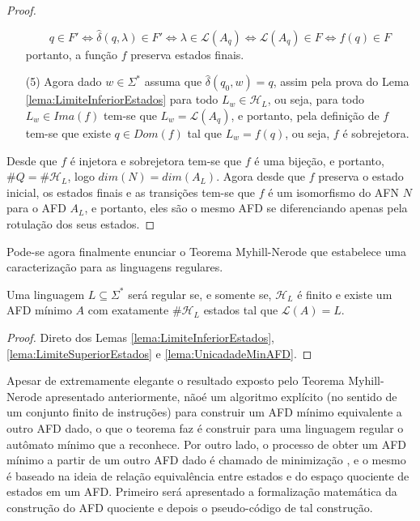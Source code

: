 \begin{proof}
\begin{itemize}
		$$q \in F' \Longleftrightarrow \widehat{\delta}(q, \lambda) \in F' \Longleftrightarrow  \lambda \in \mathcal{L}(A_q) \Longleftrightarrow \mathcal{L}(A_q) \in F \Longleftrightarrow f(q) \in F$$
		portanto, a função $f$ preserva estados finais.
		\item[(5)] Agora dado $w \in \Sigma^*$ assuma que $\widehat{\delta}(q_0, w) = q$, assim pela prova do Lema \ref{lema:LimiteInferiorEstados} para todo $L_w \in \mathcal{H}_L$, ou seja, para todo $L_w \in Ima(f)$ tem-se que $L_w = \mathcal{L}(A_q)$, e portanto, pela definição de $f$ tem-se que existe $q \in D	om(f)$ tal que $L_w = f(q)$, ou seja, $f$ é sobrejetora.
	\end{itemize}
	Desde que $f$ é injetora e sobrejetora tem-se que $f$ é uma bijeção, e portanto, $\#Q = \#\mathcal{H}_L$, logo $dim(N) = dim(A_L)$. Agora desde que $f$ preserva o estado inicial, os estados finais e as transições tem-se que $f$ é um isomorfismo do AFN $N$ para o AFD $A_L$, e portanto, eles são o mesmo AFD se diferenciando apenas pela rotulação dos seus estados. 
\end{proof}

Pode-se agora finalmente enunciar o Teorema Myhill-Nerode que estabelece uma caracterização para as linguagens regulares.

\begin{theorem}\label{teo:Myhill-Nerode}
	Uma linguagem $L \subseteq \Sigma^*$ será regular se, e somente se, $\mathcal{H}_L$ é finito e existe um AFD mínimo $A$ com exatamente $\# \mathcal{H}_L$ estados tal que $\mathcal{L}(A) = L$.
\end{theorem}

\begin{proof}
	Direto dos Lemas \ref{lema:LimiteInferiorEstados}, \ref{lema:LimiteSuperiorEstados} e \ref{lema:UnicadadeMinAFD}.
\end{proof}

Apesar de extremamente elegante o resultado exposto pelo Teorema Myhill-Nerode apresentado anteriormente, nãoé um algoritmo explícito (no sentido de um conjunto finito de instruções) para construir um AFD mínimo equivalente a outro AFD dado, o que o teorema faz é construir para uma linguagem regular o autômato mínimo que a reconhece. Por outro lado, o processo de obter um AFD mínimo a partir de um outro AFD dado é chamado de minimização \cite{benjaLivro2010}, e o mesmo é baseado na ideia de relação equivalência entre estados e do espaço quociente de estados em um AFD. Primeiro será apresentado a formalização matemática da construção do AFD quociente e depois o pseudo-código de tal construção.

